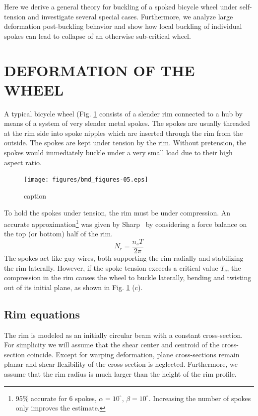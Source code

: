 \documentclass{bmd2016p}
\begin{document}
Here we derive a general theory for buckling of a spoked bicycle wheel under self-tension and investigate several special cases. Furthermore, we analyze large deformation post-buckling behavior and show how local buckling of individual spokes can lead to collapse of an otherwise sub-critical wheel.




\section{DEFORMATION OF THE WHEEL}
A typical bicycle wheel (Fig. \ref{fig:schematic} consists of a slender rim connected to a hub by means of a system of very slender metal spokes. The spokes are usually threaded at the rim side into spoke nipples which are inserted through the rim from the outside. The spokes are kept under tension by the rim. Without pretension, the spokes would immediately buckle under a very small load due to their high aspect ratio.

\begin{figure}[!h]
\centering
\texttt{[image: figures/bmd\_figures-05.eps]}
\caption{caption}
\label{fig:schematic}
\end{figure}

To hold the spokes under tension, the rim must be under compression. An accurate approximation\footnote{95\% accurate for 6 spokes, $\alpha=10^{\circ}$, $\beta=10^{\circ}$. Increasing the number of spokes only improves the estimate.} was given by Sharp~\cite{Sharp1977a} by considering a force balance on the top (or bottom) half of the rim.
	\begin{equation}\label{eq:TN}
	N_r = \frac{n_sT}{2\pi}
	\end{equation}
The spokes act like guy-wires, both supporting the rim radially and stabilizing the rim laterally. However, if the spoke tension exceeds a critical value $T_c$, the compression in the rim causes the wheel to buckle laterally, bending and twisting out of its initial plane, as shown in Fig. \ref{fig:schematic} (c).


\subsection{Rim equations}

The rim is modeled as an initially circular beam with a constant cross-section. For simplicity we will assume that the shear center and centroid of the cross-section coincide. Except for warping deformation, plane cross-sections remain planar and shear flexibility of the cross-section is neglected. Furthermore, we assume that the rim radius is much larger than the height of the rim profile.
\end{document}
